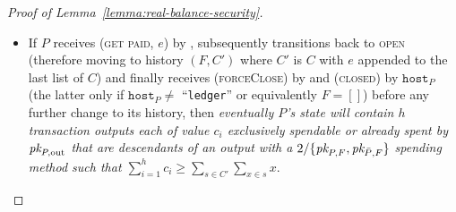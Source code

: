 \begin{proof}[Proof of Lemma~\ref{lemma:real-balance-security}]
\begin{itemize}
    $\texttt{host}_P$ (the latter only if $\texttt{host}_P \neq$ ``\texttt{ledger}'' or
    equivalently $F \neq []$) before any further change to its history, then
    \emph{eventually $P$'s \ledger state will contain $h$ transaction outputs
    each of value $c_i$ exclusively spendable or already spent by $\pk{P,
    \mathrm{out}}$ that are descendants of an output with a $2/\{\pk{P, F},
    \pk{\bar{P}, F}\}$ spending method such that $\sum\limits_{i=1}^h c_i \geq
    \sum\limits_{s \in C'} \sum\limits_{x \in s} x$}.
    \item If $P$ receives (\textsc{get paid}, $e$) by \environment, subsequently
    transitions back to \textsc{open} (therefore moving to history $(F, C')$
    where $C'$ is $C$ with $e$ appended to the last list of $C$) and finally
    receives (\textsc{forceClose}) by \environment and (\textsc{closed}) by
    $\texttt{host}_P$ (the latter only if $\texttt{host}_P \neq$ ``\texttt{ledger}'' or
    equivalently $F = []$) before any further change to its history, then
    \emph{eventually $P$'s \ledger state will contain $h$ transaction outputs
    each of value $c_i$ exclusively spendable or already spent by $\pk{P,
    \mathrm{out}}$ that are descendants of an output with a $2/\{\pk{P, F},
    \pk{\bar{P}, F}\}$ spending method such that $\sum\limits_{i=1}^h c_i \geq
    \sum\limits_{s \in C'} \sum\limits_{x \in s} x$}.
  \end{itemize}


\end{proof}
